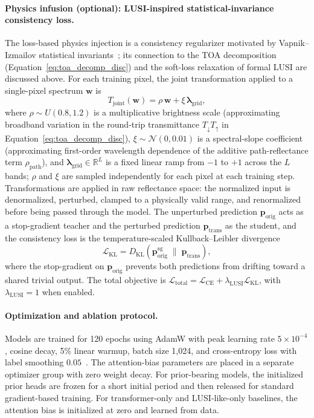 \documentclass[11pt]{article}
\newcommand{\R}{\mathbb{R}}
\begin{document}
\paragraph{Physics infusion (optional): LUSI-inspired statistical-invariance consistency loss.}
The loss-based physics injection is a consistency regularizer motivated by Vapnik--Izmailov statistical invariants~\cite{vapnik2020}; its connection to the TOA decomposition (Equation~\ref{eq:toa_decomp_disc}) and the soft-loss relaxation of formal LUSI are discussed above.
For each training pixel, the joint transformation applied to a single-pixel spectrum $\mathbf{w}$ is
\[
T_{\text{joint}}(\mathbf{w}) = \rho\,\mathbf{w} + \xi\,\bm{\lambda}_{\text{grid}},
\]
where $\rho \sim U(0.8, 1.2)$ is a multiplicative brightness scale (approximating broadband variation in the round-trip transmittance $T_{\downarrow}T_{\uparrow}$ in Equation~\ref{eq:toa_decomp_disc}), $\xi \sim \mathcal{N}(0, 0.01)$ is a spectral-slope coefficient (approximating first-order wavelength dependence of the additive path-reflectance term $\rho_{\text{path}}$), and $\bm{\lambda}_{\text{grid}} \in \R^L$ is a fixed linear ramp from $-1$ to $+1$ across the $L$ bands; $\rho$ and $\xi$ are sampled independently for each pixel at each training step.
Transformations are applied in raw reflectance space: the normalized input is denormalized, perturbed, clamped to a physically valid range, and renormalized before being passed through the model.
The unperturbed prediction $\mathbf{p}_{\text{orig}}$ acts as a stop-gradient teacher and the perturbed prediction $\mathbf{p}_{\text{trans}}$ as the student, and the consistency loss is the temperature-scaled Kullback--Leibler divergence
\[
\mathcal{L}_{\mathrm{KL}}
= D_{\mathrm{KL}}\!\left(\mathbf{p}_{\text{orig}}^{\mathrm{sg}}\;\|\;\mathbf{p}_{\text{trans}}\right),
\]
where the stop-gradient on $\mathbf{p}_{\text{orig}}$ prevents both predictions from drifting toward a shared trivial output.
The total objective is $\mathcal{L}_{\mathrm{total}} = \mathcal{L}_{\mathrm{CE}} + \lambda_{\mathrm{LUSI}}\mathcal{L}_{\mathrm{KL}}$, with $\lambda_{\mathrm{LUSI}}=1$ when enabled.

\paragraph{Optimization and ablation protocol.}
Models are trained for 120 epochs using AdamW with peak learning rate $5\times10^{-4}$, cosine decay, 5\% linear warmup, batch size 1{,}024, and cross-entropy loss with label smoothing $0.05$~\cite{szegedy2016rethinking}. 
The attention-bias parameters are placed in a separate optimizer group with zero weight decay. 
For prior-bearing models, the initialized prior heads are frozen for a short initial period and then released for standard gradient-based training. 
For transformer-only and LUSI-like-only baselines, the attention bias is initialized at zero and learned from data.
\end{document}
